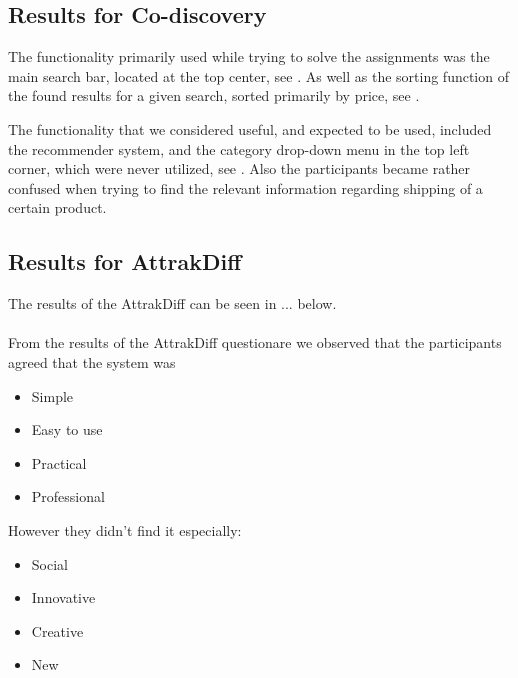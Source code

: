 \subsection{Results for Co-discovery}
The functionality primarily used while trying to solve the assignments was the main search bar, located at the top center, see . As well as the sorting function of the found results for a given search, sorted primarily by price, see .

The functionality that we considered useful, and expected to be used, included the recommender system, and the category drop-down menu in the top left corner, which were never utilized, see . Also the participants became rather confused when trying to find the relevant information regarding shipping of a certain product.

\subsection{Results for AttrakDiff}
The results of the AttrakDiff can be seen in ... below. \\

 \\

From the results of the AttrakDiff questionare we observed that the participants agreed that the system was
\begin{itemize}
\item Simple
\item Easy to use
\item Practical
\item Professional
\end{itemize}
However they didn't find it especially:
\begin{itemize}
\item Social
\item Innovative
\item Creative
\item New
\end{itemize}